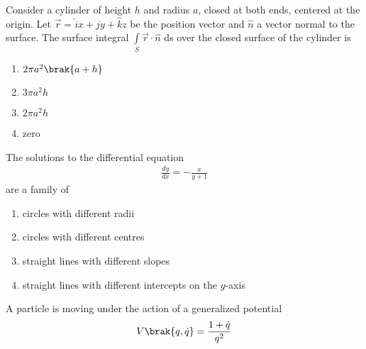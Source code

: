 \iffalse
	\title{2011}
	\author{ee24btech11027}
	\section{ph}
	\chapter{2011}
\fi
	\item Consider a cylinder of height $h$ and radius $a$, closed at both ends, centered at the origin. Let $\vec{r}=\hat{i}x+\hat{j}y+\hat{k}z$ be the position vector and $\hat{n}$ a vector normal to the surface. The surface integral $\displaystyle \int\limits_{S} \vec{r}\cdot \hat{n}$ ds
over the closed surface of the cylinder is
\begin{multicols}{2}
\begin{enumerate}
    \item $2\pi a^2\brak{a+h}$
    \item $3\pi a^2h$
    \item $2\pi a^2h$
    \item zero
\end{enumerate}
\end{multicols}
\item The solutions to the differential equation 
\begin{align*}
\frac{dy}{dx}=-\frac{x}{y+1}
\end{align*}
 are a family of
\begin{enumerate}
    \item circles with different radii
    \item circles with different centres
    \item straight lines with different slopes
    \item straight lines with different intercepts on the $y$-axis
\end{enumerate}
\item A particle is moving under the action of a generalized potential
\begin{align*}
    V\brak{q,\dot{q}}=\frac{1+\dot{q}}{q^2}
\end{align*}
